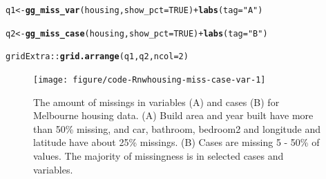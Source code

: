 \documentclass{article}\usepackage[]{graphicx}\usepackage[]{xcolor}
\makeatletter
\newcommand{\hlnum}[1]{\textcolor[rgb]{0.686,0.059,0.569}{#1}}%
\newcommand{\hlstr}[1]{\textcolor[rgb]{0.192,0.494,0.8}{#1}}%
\newcommand{\hlopt}[1]{\textcolor[rgb]{0,0,0}{#1}}%
\newcommand{\hlstd}[1]{\textcolor[rgb]{0.345,0.345,0.345}{#1}}%
\newcommand{\hlkwb}[1]{\textcolor[rgb]{0.69,0.353,0.396}{#1}}%
\newcommand{\hlkwc}[1]{\textcolor[rgb]{0.333,0.667,0.333}{#1}}%
\newcommand{\hlkwd}[1]{\textcolor[rgb]{0.737,0.353,0.396}{\textbf{#1}}}%
\newenvironment{kframe}{%
 \def\at@end@of@kframe{}%
 \ifinner\ifhmode%
  \def\at@end@of@kframe{\end{minipage}}%
  \begin{minipage}{\columnwidth}%
 \fi\fi%
 \def\FrameCommand##1{\hskip\@totalleftmargin \hskip-\fboxsep
 \colorbox{shadecolor}{##1}\hskip-\fboxsep
     \hskip-\linewidth \hskip-\@totalleftmargin \hskip\columnwidth}%
 \MakeFramed {\advance\hsize-\width
   \@totalleftmargin\z@ \linewidth\hsize
   \@setminipage}}%
 {\par\unskip\endMakeFramed%
 \at@end@of@kframe}
\newenvironment{knitrout}{}{} %
\makeatother
\begin{document}
\begin{knitrout}
\color{fgcolor}\begin{kframe}
\begin{alltt}
\hlstd{q1} \hlkwb{<-} \hlkwd{gg_miss_var}\hlstd{(housing,} \hlkwc{show_pct} \hlstd{=} \hlnum{TRUE}\hlstd{)} \hlopt{+} \hlkwd{labs}\hlstd{(}\hlkwc{tag} \hlstd{=} \hlstr{"A"}\hlstd{)}

\hlstd{q2} \hlkwb{<-} \hlkwd{gg_miss_case}\hlstd{(housing,} \hlkwc{show_pct} \hlstd{=} \hlnum{TRUE}\hlstd{)} \hlopt{+} \hlkwd{labs}\hlstd{(}\hlkwc{tag} \hlstd{=} \hlstr{"B"}\hlstd{)}

\hlstd{gridExtra}\hlopt{::}\hlkwd{grid.arrange}\hlstd{(q1, q2,} \hlkwc{ncol} \hlstd{=} \hlnum{2}\hlstd{)}
\end{alltt}
\end{kframe}\begin{figure}

{\centering \texttt{[image: figure/code-Rnwhousing-miss-case-var-1]} 

}

\caption[The amount of missings in variables (A) and cases (B) for Melbourne housing data]{The amount of missings in variables (A) and cases (B) for Melbourne housing data. (A) Build area and year built have more than 50\% missing, and car, bathroom, bedroom2 and longitude and latitude have about 25\% missings. (B) Cases are missing 5 - 50\% of values. The majority of missingness is in selected cases and variables.}\label{fig:housing-miss-case-var}
\end{figure}

\end{knitrout}
\end{document}
